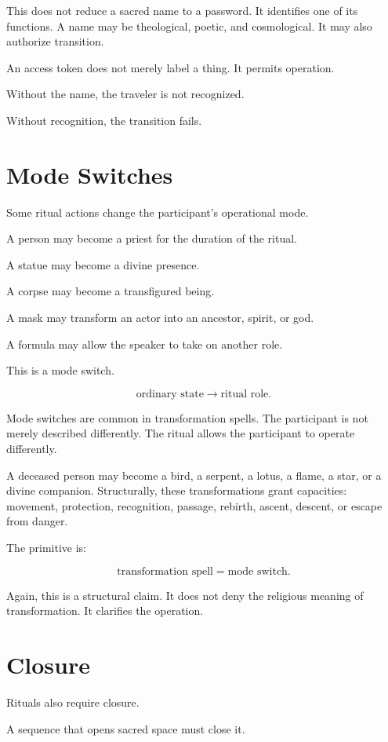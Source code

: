 \documentclass[11pt]{book}
\begin{document}
This does not reduce a sacred name to a password. It identifies one of its functions. A name may be theological, poetic, and cosmological. It may also authorize transition.

An access token does not merely label a thing. It permits operation.

Without the name, the traveler is not recognized.

Without recognition, the transition fails.

\section{Mode Switches}

Some ritual actions change the participant's operational mode.

A person may become a priest for the duration of the ritual.

A statue may become a divine presence.

A corpse may become a transfigured being.

A mask may transform an actor into an ancestor, spirit, or god.

A formula may allow the speaker to take on another role.

This is a mode switch.

\[
\text{ordinary state} \rightarrow \text{ritual role}.
\]

Mode switches are common in transformation spells. The participant is not merely described differently. The ritual allows the participant to operate differently.

A deceased person may become a bird, a serpent, a lotus, a flame, a star, or a divine companion. Structurally, these transformations grant capacities: movement, protection, recognition, passage, rebirth, ascent, descent, or escape from danger.

The primitive is:

\[
\text{transformation spell} = \text{mode switch}.
\]

Again, this is a structural claim. It does not deny the religious meaning of transformation. It clarifies the operation.

\section{Closure}

Rituals also require closure.

A sequence that opens sacred space must close it.
\end{document}
